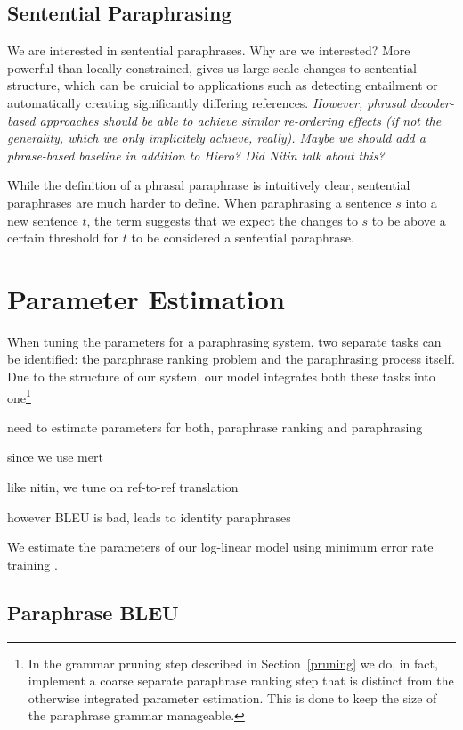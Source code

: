 \documentclass[11pt]{article}
\begin{document}
\subsection{Sentential Paraphrasing} \label{sentential_paraphrasing}

We are interested in sentential paraphrases. Why are we interested?
More powerful than locally constrained, gives us large-scale changes
to sentential structure, which can be cruicial to applications such as
detecting entailment or automatically creating significantly differing
references. \emph{However, phrasal decoder-based approaches should be
  able to achieve similar re-ordering effects (if not the generality,
  which we only implicitely achieve, really). Maybe we should add a
  phrase-based baseline in addition to Hiero? Did Nitin talk about
  this?}

While the definition of a phrasal paraphrase is intuitively clear,
sentential paraphrases are much harder to define. When paraphrasing a
sentence $s$ into a new sentence $t$, the term suggests that we expect
the changes to $s$ to be above a certain threshold for $t$ to be
considered a sentential paraphrase.


\section{Parameter Estimation} 
\label{adaptation}

When tuning the parameters for a paraphrasing system, two separate
tasks can be identified: the paraphrase ranking problem and the
paraphrasing process itself. Due to the structure of our system, our
model integrates both these tasks into one\footnote{In the grammar
  pruning step described in Section~\ref{pruning} we do, in fact,
  implement a coarse separate paraphrase ranking step that is distinct
  from the otherwise integrated parameter estimation. This is done to keep
  the size of the paraphrase grammar manageable.}

need to estimate parameters for both, paraphrase ranking and paraphrasing

since we use  mert

like nitin, we tune on ref-to-ref translation

however BLEU is bad, leads to identity paraphrases


We estimate the parameters of our log-linear model using minimum error
rate training \cite{Och2003}.

\subsection{Paraphrase BLEU} \label{pp_bleu}
\end{document}
